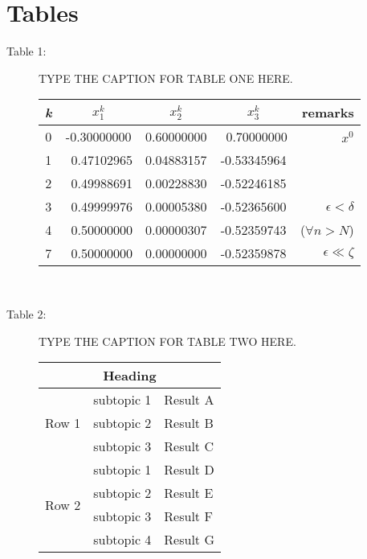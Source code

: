 \documentclass[preprint,5p]{elsarticle}
\begin{document}

\pagebreak

\section*{Tables}

\begin{description}
\item[Table 1:]  TYPE THE CAPTION FOR TABLE ONE HERE. \\

\begin{tabular}{|c||ccc||r|}
	\hline
\textbf{\em k}  &  $x_1^k$    &   $x_2^k$  & $x_3^k$ & remarks    \\
	\hline \hline
0   & -0.30000000 & 0.60000000 & ~0.70000000 & $x^0$ \\
1   & ~0.47102965 & 0.04883157 & -0.53345964 &   \\
2   & ~0.49988691 & 0.00228830 & -0.52246185 &   \\
3   & ~0.49999976 & 0.00005380 & -0.52365600 & $\epsilon<\delta$ \\
4   & ~0.50000000 & 0.00000307 & -0.52359743 & ($\forall n>N$) \\
	\hline
7   & ~0.50000000 & 0.00000000 & -0.52359878 & $\epsilon\ll\zeta$ \\
	\hline
\end{tabular} \\


\item[Table 2:]  TYPE THE CAPTION FOR TABLE TWO HERE. 

\begin{tabular}{|l|l|l|} \hline
\multicolumn{3}{|c|}{Heading} \\ \hline
\multirow{3}{*}{Row 1} & subtopic 1 & Result A \\
& subtopic 2 & Result B \\
& subtopic 3 & Result C \\ \hline
\multirow{4}{*}{Row 2} & subtopic 1 & Result D \\ 
& subtopic 2 & Result E \\
& subtopic 3 & Result F \\ 
& subtopic 4 & Result G \\ \hline
\end{tabular} \\

\end{description}
\end{document}
